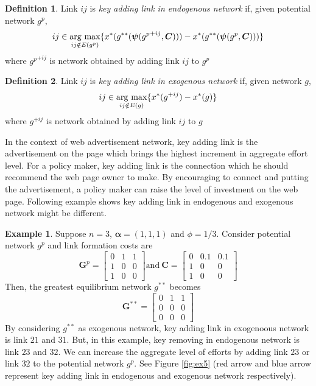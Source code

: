 \documentclass[12pt]{article}
\theoremstyle{definition}
\newtheorem{definition}{Definition}
\newtheorem{example}{Example}
\newcommand{\bm}[1]{\boldsymbol{#1}}
\newcommand{\argmax}{\mathop{\rm arg~max}\limits}
\begin{document}
\begin{definition}
	Link $ij$ is {\it{key adding link in endogenous network}} if, given potential network $g^p$,
    \[ ij \in \argmax_{ij \notin E(g^p)} \{ x^*(g^{**}(\bm{\psi}({g^p}^{+ij}, \bm{C}))) - x^*(g^{**}(\bm{\psi}(g^p, \bm{C}))) \} \]
    where ${g^p}^{+ij}$ is network obtained by adding link $ij$ to $g^p$
\end{definition}

\begin{definition}
	Link $ij$ is {\it{key adding link in exogenous network}} if, given network $g$,
    \[ ij \in \argmax_{ij \notin E(g)} \{ x^*(g^{+ij}) - x^*(g) \} \]
    where $g^{+ij}$ is network obtained by adding link $ij$ to $g$
\end{definition}

In the context of web advertisement network, key adding link is the advertisement on the page which brings the highest increment in aggregate effort level.
For a policy maker, key adding link is the connection which he should recommend the web page owner to make.
By encouraging to connect and putting the advertisement, a policy maker can raise the level of investment on the web page.
Following example shows key adding link in endogenous and exogenous network might be different.

\begin{example}
Suppose $n=3$, $\bm{\alpha} = (1,1,1)$ and $\phi = 1/3$.
Consider potential network $g^p$ and link formation costs are
\[
\bm{G}^p = \left[
            \begin{array}{ccc}
                0 & 1 & 1 \\
                1 & 0 & 0 \\
                1 & 0 & 0
            \end{array} \right]
\text{and} \ 
\bm{C} = \left[
                \begin{array}{ccc}
                    0 & 0.1 & 0.1 \\
                    1 & 0 & 0 \\
                    1 & 0 & 0
                \end{array} \right] \]
Then, the greatest equilibrium network $g^{**}$ becomes
\[ \bm{G}^{**} = \left[
    \begin{array}{ccc}
        0 & 1 & 1 \\
        0 & 0 & 0 \\
        0 & 0 & 0
    \end{array} \right]\]
By considering $g^{**}$ as exogenous network, key adding link in exogenoous network is link $21$ and $31$.
But, in this example, key removing in endogenous network is link $23$ and $32$.
We can increase the aggregate level of efforts by adding link $23$ or link $32$ to the potential network $g^p$.
See Figure \ref{fig:ex5} (red arrow and blue arrow represent key adding link in endogenous and exogenous network respectively).
\end{example}
\end{document}
